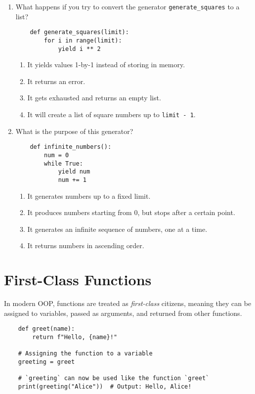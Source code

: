 \documentclass[oneside,11pt,dvipsnames]{book}
\newcommand{\code}[1]{\texttt{#1}}
\begin{document}
\begin{enumerate}

\item What happens if you try to convert the generator \texttt{generate\_squares} to a list?

\begin{lstlisting}
    def generate_squares(limit):
        for i in range(limit):
            yield i ** 2
    \end{lstlisting}

\begin{enumerate}
    \item It yields values 1-by-1 instead of storing in memory.
    \item It returns an error.
    \item It gets exhausted and returns an empty list.
    \item It will create a list of square numbers up to \code{limit - 1}.
\end{enumerate}



\item What is the purpose of this generator?
\begin{lstlisting}
    def infinite_numbers():
        num = 0
        while True:
            yield num
            num += 1
    \end{lstlisting}
\begin{enumerate}
    \item It generates numbers up to a fixed limit.
    \item It produces numbers starting from 0, but stops after a certain point.
    \item It generates an infinite sequence of numbers, one at a time.
    \item It returns numbers in ascending order.
\end{enumerate}

\end{enumerate}



\chapter{First-Class Functions}

In modern OOP, functions are treated as \emph{first-class} citizens, meaning they can be assigned to variables, passed as arguments, and returned from other functions.


\begin{lstlisting}
    def greet(name):
        return f"Hello, {name}!"

    # Assigning the function to a variable
    greeting = greet

    # `greeting` can now be used like the function `greet`
    print(greeting("Alice"))  # Output: Hello, Alice!
\end{lstlisting}
\end{document}
